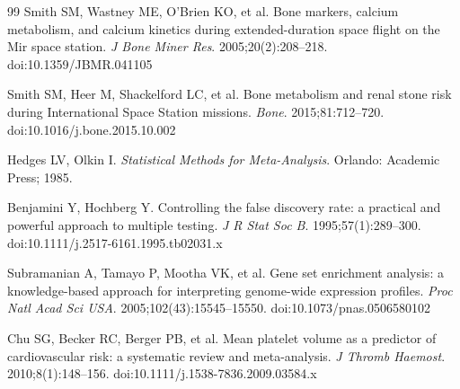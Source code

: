 \documentclass[11pt,a4paper]{article}
\begin{document}
\begin{thebibliography}{99}
Smith SM, Wastney ME, O'Brien KO, et al. Bone markers, calcium metabolism, and calcium kinetics during extended-duration space flight on the Mir space station. \textit{J Bone Miner Res}. 2005;20(2):208--218. doi:10.1359/JBMR.041105

Smith SM, Heer M, Shackelford LC, et al. Bone metabolism and renal stone risk during International Space Station missions. \textit{Bone}. 2015;81:712--720. doi:10.1016/j.bone.2015.10.002

Hedges LV, Olkin I. \textit{Statistical Methods for Meta-Analysis}. Orlando: Academic Press; 1985.

Benjamini Y, Hochberg Y. Controlling the false discovery rate: a practical and powerful approach to multiple testing. \textit{J R Stat Soc B}. 1995;57(1):289--300. doi:10.1111/j.2517-6161.1995.tb02031.x

Subramanian A, Tamayo P, Mootha VK, et al. Gene set enrichment analysis: a knowledge-based approach for interpreting genome-wide expression profiles. \textit{Proc Natl Acad Sci USA}. 2005;102(43):15545--15550. doi:10.1073/pnas.0506580102

Chu SG, Becker RC, Berger PB, et al. Mean platelet volume as a predictor of cardiovascular risk: a systematic review and meta-analysis. \textit{J Thromb Haemost}. 2010;8(1):148--156. doi:10.1111/j.1538-7836.2009.03584.x

\end{thebibliography}
\end{document}
